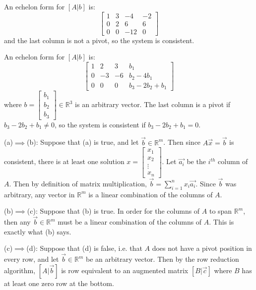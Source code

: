 \documentclass[12pt,letterpaper]{article}
\begin{document}
\begin{enumerate}
  \Answer
  An echelon form for $[A|b]$ is:
  \[
    \left[
      \begin{array}{ccc|c}
        1&3&-4&-2\\
        0&2&6&6\\
        0&0&-12&0
      \end{array}
    \right]
  \] and the last column is not a pivot, so the system is consistent.

  \Answer An echelon form for $[A|b]$ is:
  \[
    \left[
      \begin{array}{ccc|c}
        1&2&3&b_1\\
        0&-3&-6&b_2-4b_1\\
        0&0&0&b_3-2b_2+b_1
      \end{array}
    \right]
  \] where $b=\left[\begin{array}{c} b_1\\b_2\\b_3\end{array}\right]\in \mathbb{R}^3$ is an arbitrary vector. The last column is a pivot if $b_3-2b_2+b_1\neq 0$, so the system is consistent if $b_3-2b_2+b_1=0$. 

  \Answer
  (a)$\implies$(b): Suppose that (a) is true, and let $\vec{b}\in \mathbb{R}^m$. Then since $A\vec{x}=\vec{b}$ is consistent, there is at least one solution $x=\left[\begin{array}{c}x_1\\x_2\\ \vdots\\ x_n\end{array}\right]$. Let $\vec{a_i}$ be the $i^{th}$ column of $A$. Then by definition of matrix multiplication, $\vec{b}=\sum_{i=1}^n x_i\vec{a_i}$. Since $\vec{b}$ was arbitrary, any vector in $\mathbb{R}^m$ is a linear combination of the columns of $A$. 
  
  (b)$\implies$(c): Suppose that (b) is true. In order for the columns of $A$ to span $\mathbb{R}^m$, then any $\vec{b}\in \mathbb{R}^m$ must be a linear combination of the columns of $A$. This is exactly what (b) says.

  (c)$\implies$(d): Suppose that (d) is false, i.e. that $A$ does not have a pivot position in every row, and let $\vec{b}\in \mathbb{R}^m$ be an arbitrary vector. Then by the row reduction algorithm, $[A|\vec{b}]$ is row equivalent to an augmented matrix $[B|\vec{c}]$ where $B$ has at least one zero row at the bottom.


\end{enumerate}
\end{document}
